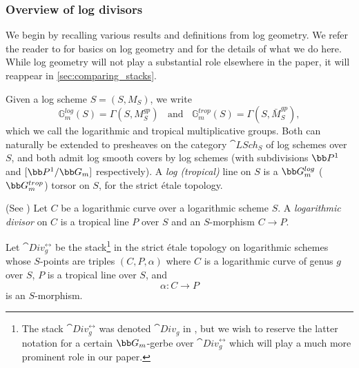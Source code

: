 \subsubsection{Overview of log divisors}

We begin by recalling various results and definitions from log geometry. We refer the reader to \cite{Kato1989Logarithmic-str} for basics on log geometry and \cite{Marcus2017Logarithmic-com} for the details of what we do here.
While log geometry will not play a substantial role elsewhere in the paper,
it will reappear in \cref{sec:comparing_stacks}.


Given a log scheme $S = (S, M_S)$, we write
\begin{equation*}
\mathbb G_m^{log}(S) = \Gamma(S, M_S^{gp})
\ \ \ \
\text{and} \ \ \ \
\mathbb G_m^{trop}(S) = \Gamma(S, \bar M_S^{gp}),
\end{equation*}
which we call the logarithmic and tropical multiplicative groups.  Both can naturally be extended to presheaves on the category $\cat{LSch}_S$ of log schemes over $S$,
and both
admit log smooth covers by log schemes (with subdivisions $\bb P^1$ and $[\bb P^1/\bb G_m]$ respectively). A \emph{log (tropical)} line on $S$ is a $\bb G_m^{log}$ ($\bb G_m^{trop}$) torsor on $S$, for the strict \'etale topology.


\begin{definition}
\notready(See \cite[Def. 4.6]{Marcus2017Logarithmic-com})
\label{Def:logdivisor}%
\source{pixtons-formula-abel-jacobi-picard-stack}
Let $C$ be a logarithmic curve over a logarithmic scheme $S$. A \emph{logarithmic divisor} on $C$ is a tropical line $P$ over $S$ and an $S$-morphism $C \to P$.

Let $\cat{Div}^{\rel}_g$ be the stack{\footnote{The stack $\cat{Div}^{\rel}_g$ was denoted $\cat{Div}_g$ in \cite{Marcus2017Logarithmic-com}, but we wish to reserve the
latter notation for a certain $\bb G_m$-gerbe over $\cat{Div}^{\rel}_g$ which will play a much more prominent role in our paper.}}
in the strict \'etale topology on logarithmic schemes whose $S$-points are triples $(C, P, \alpha)$ where $C$ is a logarithmic curve of genus $g$ over $S$, $P$ is a tropical line over $S$, and
$$\alpha \colon  C \to P$$ is an $S$-morphism.
\end{definition}



